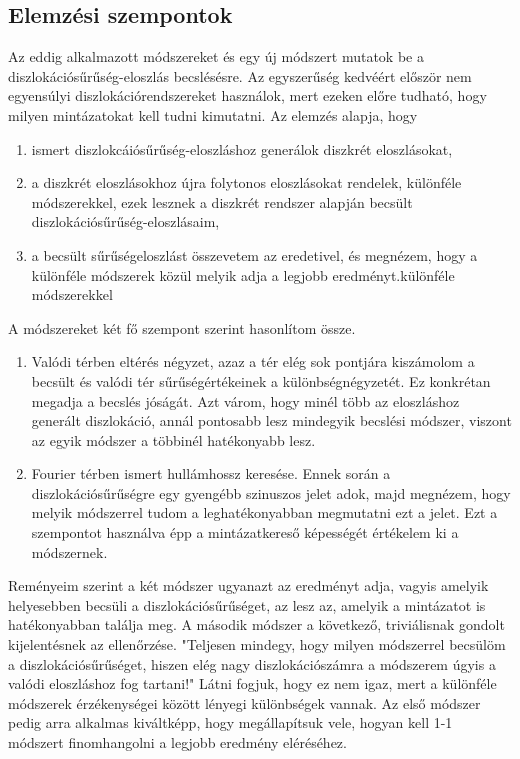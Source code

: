 \documentclass[10pt,a4paper]{scrartcl}
\begin{document}
\subsection{Elemzési szempontok}
Az eddig alkalmazott módszereket és egy új módszert mutatok be a diszlokációsűrűség-eloszlás becslésésre. Az egyszerűség kedvéért először nem egyensúlyi diszlokációrendszereket használok, mert ezeken előre tudható, hogy milyen mintázatokat kell tudni kimutatni. Az elemzés alapja, hogy
\begin{enumerate}
    \item ismert diszlokcáiósűrűség-eloszláshoz generálok diszkrét eloszlásokat,
    \item a diszkrét eloszlásokhoz újra folytonos eloszlásokat rendelek, különféle módszerekkel, ezek lesznek a diszkrét rendszer alapján becsült diszlokációsűrűség-eloszlásaim,
    \item a becsült sűrűségeloszlást összevetem az eredetivel, és megnézem, hogy a különféle módszerek közül melyik adja a legjobb eredményt.különféle módszerekkel
\end{enumerate}

A módszereket két fő szempont szerint hasonlítom össze.
\begin{enumerate}
    \item Valódi térben eltérés négyzet, azaz a tér elég sok pontjára kiszámolom a becsült és valódi tér sűrűségértékeinek a különbségnégyzetét. Ez konkrétan megadja a becslés jóságát. Azt várom, hogy minél több az eloszláshoz generált diszlokáció, annál pontosabb lesz mindegyik becslési módszer, viszont az egyik módszer a többinél hatékonyabb lesz.
    \item Fourier térben ismert hullámhossz keresése. Ennek során a diszlokációsűrűségre egy gyengébb szinuszos jelet adok, majd megnézem, hogy melyik módszerrel tudom a leghatékonyabban megmutatni ezt a jelet. Ezt a szempontot használva épp a mintázatkereső képességét értékelem ki a módszernek.
\end{enumerate}

Reményeim szerint a két módszer ugyanazt az eredményt adja, vagyis amelyik helyesebben becsüli a diszlokációsűrűséget, az lesz az, amelyik a mintázatot is hatékonyabban találja meg. A második módszer a következő, triviálisnak gondolt kijelentésnek az ellenőrzése. "Teljesen mindegy, hogy milyen módszerrel becsülöm a diszlokációsűrűséget, hiszen elég nagy diszlokációszámra a módszerem úgyis a valódi eloszláshoz fog tartani!" Látni fogjuk, hogy ez nem igaz, mert a különféle módszerek érzékenységei között lényegi különbségek vannak. Az első módszer pedig arra alkalmas kiváltképp, hogy megállapítsuk vele, hogyan kell 1-1 módszert finomhangolni a legjobb eredmény eléréséhez.
\end{document}
